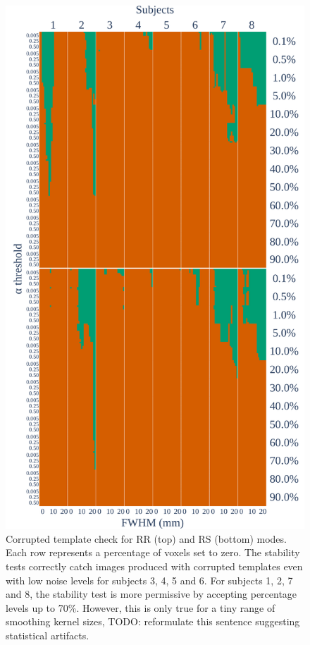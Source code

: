 \documentclass[lettersize,journal]{IEEEtran}
\newcommand{\TODO}[1]{\color{red}\textsc{TODO:} #1\color{black}\xspace}
\begin{document}
\begin{figure}
    \centering
    \includegraphics[width=\linewidth]{figures/template/template_fwe_bonferroni.pdf}
    \caption{Corrupted template check for RR (top) and RS (bottom) modes. Each row represents a percentage of voxels set to zero. The stability tests correctly catch images produced with corrupted templates even with low noise levels for subjects 3, 4, 5 and 6. For subjects 1, 2, 7 and 8, the stability test is more permissive by accepting percentage levels up to 70\%. However, this is only true for a tiny range of smoothing kernel sizes, \TODO{reformulate this sentence} suggesting statistical artifacts.}
    \label{fig:template_bonferroni}
\end{figure}
\end{document}
